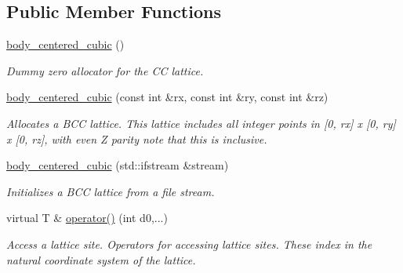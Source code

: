 \subsection*{Public Member Functions}
\begin{DoxyCompactItemize}
\item 
\mbox{\label{classsisl_1_1body__centered__cubic_a061da4d24b45a2d4d2ebbc1577a05df9}} 
\hyperlink{classsisl_1_1body__centered__cubic_a061da4d24b45a2d4d2ebbc1577a05df9}{body\+\_\+centered\+\_\+cubic} ()
\begin{DoxyCompactList}\small\item\em Dummy zero allocator for the CC lattice. \end{DoxyCompactList}\item 
\mbox{\label{classsisl_1_1body__centered__cubic_a4d5c7c5f734201a1e235e7d0ede642a0}} 
\hyperlink{classsisl_1_1body__centered__cubic_a4d5c7c5f734201a1e235e7d0ede642a0}{body\+\_\+centered\+\_\+cubic} (const int \&rx, const int \&ry, const int \&rz)
\begin{DoxyCompactList}\small\item\em Allocates a B\+CC lattice. This lattice includes all integer points in \mbox{[}0, rx\mbox{]} x \mbox{[}0, ry\mbox{]} x \mbox{[}0, rz\mbox{]}, with even Z parity note that this is inclusive. \end{DoxyCompactList}\item 
\mbox{\label{classsisl_1_1body__centered__cubic_ac81d4da54d2487737a8066944b6b49dd}} 
\hyperlink{classsisl_1_1body__centered__cubic_ac81d4da54d2487737a8066944b6b49dd}{body\+\_\+centered\+\_\+cubic} (std\+::ifstream \&stream)
\begin{DoxyCompactList}\small\item\em Initializes a B\+CC lattice from a file stream. \end{DoxyCompactList}\item 
\mbox{\label{classsisl_1_1body__centered__cubic_a413597e910db22f5aec4113ec6cbd36b}} 
virtual T \& \hyperlink{classsisl_1_1body__centered__cubic_a413597e910db22f5aec4113ec6cbd36b}{operator()} (int d0,...)
\begin{DoxyCompactList}\small\item\em Access a lattice site. Operators for accessing lattice sites. These index in the natural coordinate system of the lattice. \end{DoxyCompactList}\item 

\end{DoxyCompactItemize}
